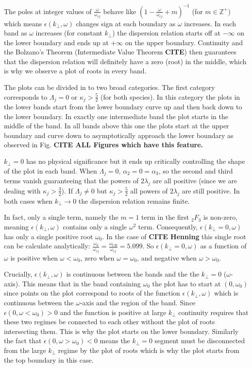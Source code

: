 \documentclass[12pt,a4paper]{article}
\begin{document}
    The poles at integer values of $\frac{\omega}{\omega_{cj}}$ behave like $(1 - \frac{\omega}{\omega_{cj}} + m)^{-1}$ (for $m \in \mathbb{Z}^+$) which means $\epsilon(k_\perp, \omega)$ changes sign at each boundary as $\omega$ increases.
    In each band as $\omega$ increases (for constant $k_\perp$) the dispersion relation starts off at $-\infty$ on the lower boundary and ends up at $+\infty$ on the upper boundary.
    Continuity and the Bolzano's Theorem (Intermediate Value Theorem \textbf{CITE}) then guarantees that the dispersion relation will definitely have a zero (root) in the middle, which is why we observe a plot of roots in every band.

    The plots can be divided in to two broad categories.
    The first category corresponds to $\Lambda_j = 0$ or $\kappa_j > \frac{5}{2}$ (for both species).
    In this category the plots in the lower bands start from the lower boundary curve up and then back down to the lower boundary.
    In exactly one intermediate band the plot starts in the middle of the band.
    In all bands above this one the plots start at the upper boundary and curve down to asymptotically approach the lower boundary as observed in Fig. \textbf{CITE ALL Figures which have this feature.}

    $k_\perp = 0$ has no physical significance but it ends up critically controlling the shape of the plot in each band.
    When $\Lambda_j = 0$, $\alpha_2 = 0 = \alpha_3$, so the second and third terms vanish guaranteeing that the powers of $2 \lambda_j$ are all positive (since we are dealing with $\kappa_j > \frac{3}{2}$).
    If $\Lambda_j \neq 0$ but $\kappa_j > \frac{5}{2}$ all powers of $2 \lambda_j$ are still positive.
    In both cases when $k_\perp \rightarrow 0$ the dispersion relation remains finite.

    In fact, only a single term, namely the $m = 1$ term in the first $_2F_3$ is non-zero, meaning $\epsilon(k_\perp, \omega)$ contains only a single $\omega^2$ term.
    Consequently, $\epsilon(k_\perp = 0, \omega)$ has only a single positive root $\omega_0$.
    In the case of \textbf{CITE Henning} this single root can be calculate analytically: $\frac{\omega_0}{\omega_{cj}} = \frac{\omega_{UH}}{\omega_{cj}} = 5.099$.
    So $\epsilon(k_\perp = 0, \omega)$ as a function of $\omega$ is positive when $\omega < \omega_0$, zero when $\omega = \omega_0$, and negative when $\omega > \omega_0$.

    Crucially, $\epsilon(k_\perp, \omega)$ is continuous between the bands and the the $k_\perp = 0$ ($\omega$-axis).
    This means that in the band containing $\omega_0$ the plot has to start at $(0, \omega_0)$ since points on the plot correspond to roots of the function $\epsilon(k_\perp, \omega)$ which is continuous between the $\omega$-axis and the region of the band.
    Since $\epsilon(0, \omega < \omega_0) > 0$ and the function is positive at large $k_\perp$ continuity requires that these two regimes be connected to each other without the plot of roots intersecting them.
    This is why the plot starts on the lower boundary.
    Similarly the fact that $\epsilon(0, \omega > \omega_0) < 0$ means the $k_\perp = 0$ segment must be disconnected from the large $k_\perp$ regime by the plot of roots which is why the plot starts from the top boundary in this case.
\end{document}
